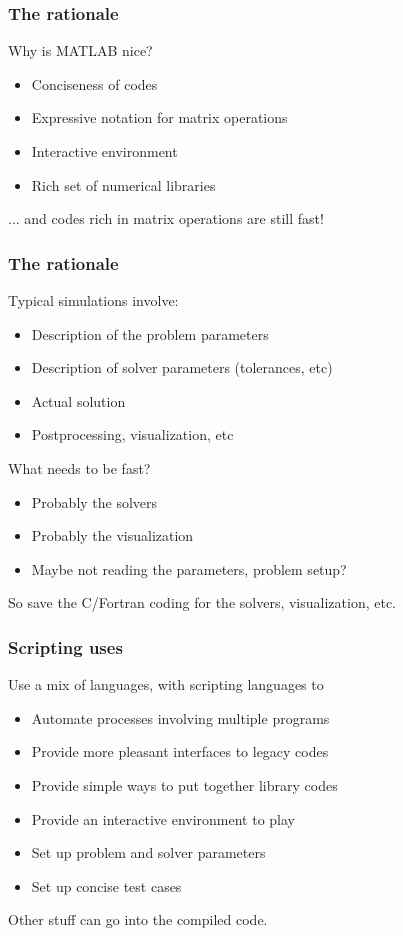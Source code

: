 \documentclass{beamer}
\begin{document}
\begin{frame}[fragile]
  \frametitle{The rationale}

  Why is MATLAB nice?
  \begin{itemize}
  \item Conciseness of codes
  \item Expressive notation for matrix operations
  \item Interactive environment
  \item Rich set of numerical libraries
  \end{itemize}
  ... and codes rich in matrix operations are still fast!
\end{frame}


\begin{frame}
  \frametitle{The rationale}

  Typical simulations involve:
  \begin{itemize}
  \item Description of the problem parameters
  \item Description of solver parameters (tolerances, etc)
  \item Actual solution
  \item Postprocessing, visualization, etc
  \end{itemize}
  
  \vspace{5mm}
  What needs to be fast?
  \begin{itemize}
  \item Probably the solvers
  \item Probably the visualization
  \item Maybe not reading the parameters, problem setup?
  \end{itemize}

  \vspace{5mm}
  So save the C/Fortran coding for the solvers, visualization, etc.

\end{frame}


\begin{frame}
  \frametitle{Scripting uses}

  Use a mix of languages, with scripting languages to
  \begin{itemize}
  \item Automate processes involving multiple programs
  \item Provide more pleasant interfaces to legacy codes
  \item Provide simple ways to put together library codes
  \item Provide an interactive environment to play
  \item Set up problem and solver parameters
  \item Set up concise test cases
  \end{itemize}
  
  \vspace{5mm}
  Other stuff can go into the compiled code.

\end{frame}
\end{document}
